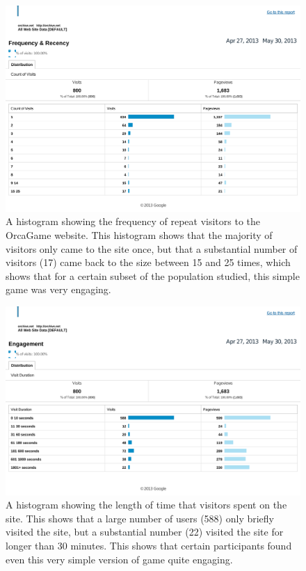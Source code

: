 \documentclass[12pt,oneside]{book}
\begin{document}
\begin{figure}[h]
\centering
\includegraphics[width=\columnwidth]{figures/orcagameGoogleAnalyticsFrequency}
\caption{A histogram showing the frequency of repeat visitors to the
  OrcaGame website.  This histogram shows that the majority of
  visitors only came to the site once, but that a substantial number
  of visitors (17) came back to the size between 15 and 25 times,
  which shows that for a certain subset of the population studied,
  this simple game was very engaging.}
\label{fig:OrcaGameGoogleAnalyticsFrequency}
\end{figure}


\begin{figure}[h]
\centering
\includegraphics[width=\columnwidth]{figures/orcagameGoogleAnalyticsEngagement}
\caption{A histogram showing the length of time that visitors spent on
  the site.  This shows that a large number of users (588) only
  briefly visited the site, but a substantial number (22) visited the
  site for longer than 30 minutes.  This shows that certain
  participants found even this very simple version of game quite
  engaging. }
\label{fig:OrcaGameGoogleAnalyticsEngagement}
\end{figure}
\end{document}
